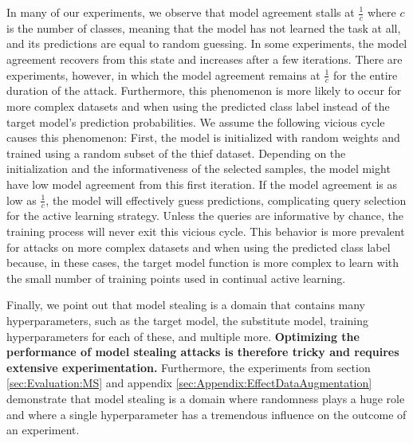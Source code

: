 In many of our experiments, we observe that model agreement stalls at $\frac{1}{c}$ where $c$ is the number of classes, meaning that the model has not learned the task at all, and its
predictions are equal to random guessing. In some experiments, the model agreement recovers from this state and increases after a few iterations. There are experiments,
however, in which the model agreement remains at $\frac{1}{c}$ for the entire duration of the attack. Furthermore, this phenomenon is more likely to occur
for more complex datasets and when using the predicted class label instead of the target model's prediction probabilities. We assume the
following vicious cycle causes this phenomenon: First, the model is initialized with random weights and trained using a random subset of the thief dataset. Depending on the initialization and 
the informativeness of the selected samples, the model might have low model agreement from this first iteration. If the model agreement is as low as $\frac{1}{c}$, the
model will effectively guess predictions, complicating query selection for the active learning strategy. Unless the queries are informative by chance, the training process
will never exit this vicious cycle. This behavior is more prevalent for attacks on more complex datasets and when using the predicted class label because, in these cases,
the target model function is more complex to learn with the small number of training points used in continual active learning. \par
Finally, we point out that model stealing is a domain that contains many hyperparameters, such as the target model, the substitute model, training hyperparameters
for each of these, and multiple more. \textbf{Optimizing the performance of model stealing attacks is therefore tricky and requires extensive experimentation.}
Furthermore, the experiments from section
\ref{sec:Evaluation:MS} and appendix \ref{sec:Appendix:EffectDataAugmentation} demonstrate that model stealing is a domain where randomness plays a huge role and where
a single hyperparameter has a tremendous influence on the outcome of an experiment. 